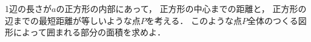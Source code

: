 \documentclass[../../main.tex]{subfiles}
\begin{document}
1辺の長さが$a$の正方形の内部にあって，
正方形の中心までの距離と，
正方形の辺までの最短距離が等しいような点$P$を考える．
このような点$P$全体のつくる図形によって囲まれる部分の面積を求めよ．
\end{document}
